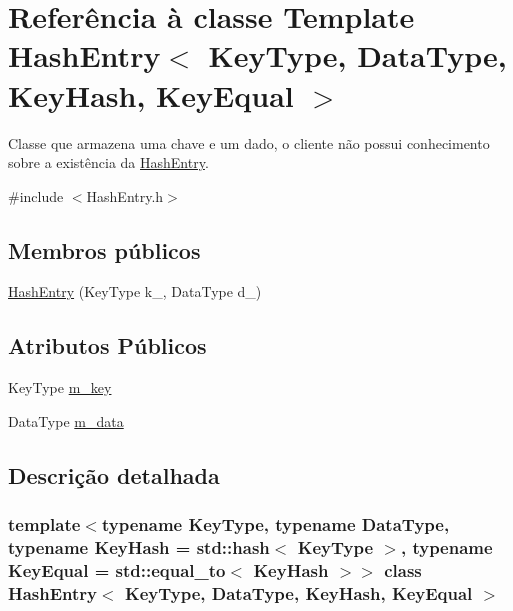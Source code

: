 \hypertarget{classHashEntry}{}\section{Referência à classe Template Hash\+Entry$<$ Key\+Type, Data\+Type, Key\+Hash, Key\+Equal $>$}
\label{classHashEntry}


Classe que armazena uma chave e um dado, o cliente não possui conhecimento sobre a existência da \hyperlink{classHashEntry}{Hash\+Entry}.  




{\ttfamily \#include $<$Hash\+Entry.\+h$>$}

\subsection*{Membros públicos}
\begin{DoxyCompactItemize}
\item 
\hyperlink{classHashEntry_a1247b00f740887cdaeb1c77c2fa05225}{Hash\+Entry} (Key\+Type k\+\_\+, Data\+Type d\+\_\+)
\end{DoxyCompactItemize}
\subsection*{Atributos Públicos}
\begin{DoxyCompactItemize}
\item 
Key\+Type \hyperlink{classHashEntry_a244e0393cbbe8a50f96f280fdbbaf311}{m\+\_\+key}
\item 
Data\+Type \hyperlink{classHashEntry_aad378adf91322196c55be012d2fb2371}{m\+\_\+data}
\end{DoxyCompactItemize}


\subsection{Descrição detalhada}
\subsubsection*{template$<$typename Key\+Type, typename Data\+Type, typename Key\+Hash = std\+::hash$<$ Key\+Type $>$, typename Key\+Equal = std\+::equal\+\_\+to$<$ Key\+Hash $>$$>$\newline
class Hash\+Entry$<$ Key\+Type, Data\+Type, Key\+Hash, Key\+Equal $>$}

